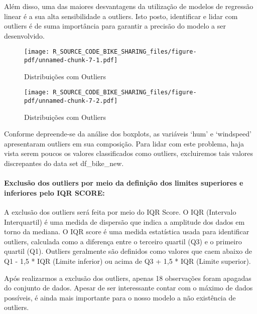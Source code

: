 \documentclass[
  letterpaper,
  DIV=11,
  numbers=noendperiod]{scrartcl}
\let\oldparagraph\paragraph
\renewcommand{\paragraph}[1]{\oldparagraph{#1}\mbox{}}
\begin{document}
Além disso, uma das maiores desvantagens da utilização de modelos de
regressão linear é a sua alta sensibilidade a outliers. Isto posto,
identificar e lidar com outliers é de suma importância para garantir a
precisão do modelo a ser desenvolvido.

\begin{figure}[H]

{\centering \texttt{[image: R\_SOURCE\_CODE\_BIKE\_SHARING\_files/figure-pdf/unnamed-chunk-7-1.pdf]}

}

\caption{Distribuições com Outliers}

\end{figure}%

\begin{figure}[H]

{\centering \texttt{[image: R\_SOURCE\_CODE\_BIKE\_SHARING\_files/figure-pdf/unnamed-chunk-7-2.pdf]}

}

\caption{Distribuições com Outliers}

\end{figure}%

Conforme depreende-se da análise dos boxplots, as variáveis `hum' e
`windspeed' apresentaram outliers em sua composição. Para lidar com este
problema, haja vista serem poucos os valores classificados como
outliers, excluiremos tais valores discrepantes do data set
df\_bike\_new.

\paragraph{Exclusão dos outliers por meio da definição dos limites
superiores e inferiores pelo IQR
SCORE:}\label{exclusuxe3o-dos-outliers-por-meio-da-definiuxe7uxe3o-dos-limites-superiores-e-inferiores-pelo-iqr-score}

A exclusão dos outliers será feita por meio do IQR Score. O IQR
(Intervalo Interquartil) é uma medida de dispersão que indica a
amplitude dos dados em torno da mediana. O IQR score é uma medida
estatística usada para identificar outliers, calculada como a diferença
entre o terceiro quartil (Q3) e o primeiro quartil (Q1). Outliers
geralmente são definidos como valores que caem abaixo de Q1 - 1,5 * IQR
(Limite inferior) ou acima de Q3 + 1,5 * IQR (Limite superior).

Após realizarmos a exclusão dos outliers, apenas 18 observações foram
apagadas do conjunto de dados. Apesar de ser interessante contar com o
máximo de dados possíveis, é ainda mais importante para o nosso modelo a
não existência de outliers.
\end{document}
